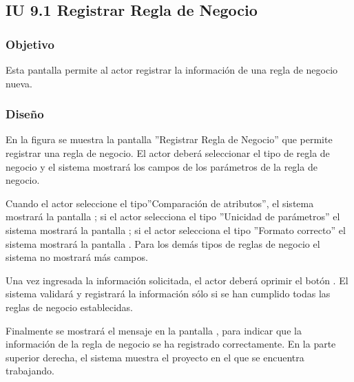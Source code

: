\subsection{IU 9.1 Registrar Regla de Negocio}

\subsubsection{Objetivo}
	Esta pantalla permite al actor registrar la información de una regla de negocio nueva.
\subsubsection{Diseño}
	En la figura  se muestra la pantalla ''Registrar Regla de Negocio'' que permite registrar una regla de negocio. El actor deberá seleccionar el tipo de regla de negocio y el sistema mostrará los campos de los parámetros de la regla de negocio.
	
	Cuando el actor seleccione el tipo''Comparación de atributos'', el sistema mostrará la pantalla ; si el actor selecciona el tipo ''Unicidad de parámetros'' el sistema mostrará la pantalla ; si el actor selecciona el tipo ''Formato correcto'' el sistema mostrará la pantalla . Para los demás tipos de reglas de negocio el sistema no mostrará más campos.
	
	Una vez ingresada la información solicitada, el actor deberá oprimir el botón . El sistema validará y registrará la información sólo si se han cumplido todas las reglas de negocio establecidas.
	
	Finalmente se mostrará el mensaje  en la pantalla , para indicar que la información de la regla de negocio se ha registrado correctamente.
	En la parte superior derecha, el sistema muestra el proyecto en el que se encuentra trabajando.

